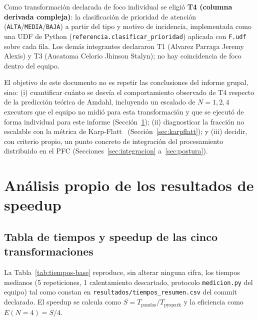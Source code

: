 \documentclass[11pt,a4paper]{article}
\begin{document}
Como transformación declarada de foco individual se eligió \textbf{T4 (columna derivada
compleja)}: la clasificación de prioridad de atención (\texttt{ALTA}/\texttt{MEDIA}/\texttt{BAJA})
a partir del tipo y motivo de incidencia, implementada como una UDF de Python
(\texttt{referencia.clasificar\_prioridad}) aplicada con \texttt{F.udf} sobre cada fila. Los
demás integrantes declararon T1 (Alvarez Parraga Jeremy Alexis) y T3 (Aucatoma Celorio Jhinson
Stalyn); no hay coincidencia de foco dentro del equipo.

El objetivo de este documento no es repetir las conclusiones del informe grupal, sino: (i)
cuantificar cuánto se desvía el comportamiento observado de T4 respecto de la predicción
teórica de Amdahl, incluyendo un escalado de \(N=1,2,4\) executors que el equipo no midió para
esta transformación y que se ejecutó de forma individual para este informe (Sección~\ref{sec:analisis});
(ii) diagnosticar la fracción no escalable con la métrica de Karp-Flatt~\cite{karpflatt1990measuring}
(Sección~\ref{sec:karpflatt}); y (iii) decidir, con criterio propio, un punto concreto de
integración del procesamiento distribuido en el PFC (Secciones~\ref{sec:integracion}
a~\ref{sec:postura}).

\section{Análisis propio de los resultados de speedup}
\label{sec:analisis}

\subsection{Tabla de tiempos y speedup de las cinco transformaciones}

La Tabla~\ref{tab:tiempos-base} reproduce, sin alterar ninguna cifra, los tiempos medianos (5
repeticiones, 1 calentamiento descartado, protocolo \texttt{medicion.py} del equipo) tal como
constan en \texttt{resultados/tiempos\_resumen.csv} del commit declarado. El speedup se calcula
como \(S = T_{\text{pandas}} / T_{\text{pyspark}}\) y la eficiencia como \(E(N{=}4) = S/4\).
\end{document}
